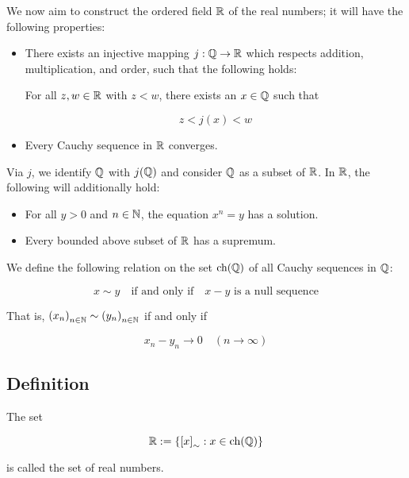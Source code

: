 We now aim to construct the ordered field \( \mathbb{R} \) of the real numbers;
it will have the following properties:

\begin{itemize}
	
	\item There exists an injective mapping \( j : \mathbb{Q} \to \mathbb{R} \) which respects addition, 
    	  multiplication, and order, such that the following holds:
		
		For all \( z, w \in \mathbb{R} \) with \( z < w \), there exists an \( x \in \mathbb{Q} \) such that
		
		\[
			z < j(x) < w
		\]

	\item Every Cauchy sequence in \( \mathbb{R} \) converges.

\end{itemize}

Via \(j\), we identify \( \mathbb{Q} \) with \( j(\mathbb{Q}) \) and consider \( \mathbb{Q} \) as a 
subset of \( \mathbb{R} \). In \( \mathbb{R} \), the following will additionally hold:

\begin{itemize}

	\item For all \( y > 0 \) and \( n \in \mathbb{N} \), the equation \( x^n = y \) has a solution.

	\item Every bounded above subset of \( \mathbb{R} \) has a supremum.

\end{itemize}

We define the following relation on the set \( \operatorname{ch}(\mathbb{Q}) \) of all Cauchy sequences 
in \( \mathbb{Q} \):

\[
	x \sim y \quad \text{if and only if} \quad x - y \text{ is a null sequence}
\]

That is, \( {(x_n)}_{n \in \mathbb{N}} \sim {(y_n)}_{n \in \mathbb{N}} \) if and only if

\[
	x_n - y_n \to 0 \quad (n \to \infty)
\]

\subsection{Definition}

The set

\[
	\mathbb{R} := \{ {[x]}_{\sim} : x \in \operatorname{ch}(\mathbb{Q}) \}
\]

is called the set of real numbers.

